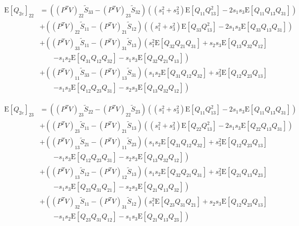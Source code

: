 \documentclass[10pt]{article}
\newcommand{\expect}[1]{\ensuremath{\mathrm{E}\left[ #1 \right]}}
\begin{document}
\begin{align}
	\expect{Q_{2e}}_{22} &= \left( (P^TV)_{22}\tilde{S}_{33} - (P^TV)_{23}\tilde{S}_{32} \right)\left( (s_1^2+s_3^2)\expect{Q_{11}Q_{13}^2} - 2s_1s_3\expect{Q_{11}Q_{13}Q_{31}} \right) \nonumber \\
	&+ \left( (P^TV)_{22}\tilde{S}_{11} - (P^TV)_{21}\tilde{S}_{12} \right)\left( (s_1^2+s_3^2)\expect{Q_{33}Q_{13}^2} - 2s_1s_3\expect{Q_{33}Q_{13}Q_{31}} \right) \nonumber \\
	&+ \left( (P^TV)_{33}\tilde{S}_{11} - (P^TV)_{31}\tilde{S}_{13} \right)\left( s_1^2\expect{Q_{32}Q_{21}Q_{31}} + s_2s_3\expect{Q_{13}Q_{32}Q_{12}} \right. \nonumber \\ &\qquad \left. - s_1s_2\expect{Q_{31}Q_{12}Q_{32}} - s_1s_3\expect{Q_{32}Q_{21}Q_{13}} \right) \nonumber \\
	&+ \left( (P^TV)_{11}\tilde{S}_{33} - (P^TV)_{13}\tilde{S}_{31} \right)\left( s_1s_2\expect{Q_{31}Q_{12}Q_{32}} + s_3^2\expect{Q_{12}Q_{23}Q_{13}} \right. \nonumber \\ &\qquad \left. - s_1s_3\expect{Q_{12}Q_{23}Q_{31}} - s_2s_3\expect{Q_{13}Q_{32}Q_{12}} \right)
\end{align}

\begin{align}
	\expect{Q_{2e}}_{23} &= \left( (P^TV)_{23}\tilde{S}_{22} - (P^TV)_{22}\tilde{S}_{23} \right)\left( (s_1^2+s_3^2)\expect{Q_{11}Q_{13}^2} - 2s_1s_3\expect{Q_{11}Q_{13}Q_{31}} \right) \nonumber \\
	&+ \left( (P^TV)_{23}\tilde{S}_{11} - (P^TV)_{21}\tilde{S}_{13} \right)\left( (s_1^2+s_3^2)\expect{Q_{22}Q_{13}^2} - 2s_1s_3\expect{Q_{22}Q_{13}Q_{31}} \right) \nonumber \\
	&+ \left( (P^TV)_{13}\tilde{S}_{21} - (P^TV)_{11}\tilde{S}_{23} \right)\left( s_1s_2\expect{Q_{31}Q_{12}Q_{32}} + s_3^2\expect{Q_{12}Q_{23}Q_{13}} \right. \nonumber \\ &\qquad \left. - s_1s_3\expect{Q_{12}Q_{23}Q_{31}} - s_2s_3\expect{Q_{13}Q_{32}Q_{12}} \right) \nonumber \\
	&+ \left( (P^TV)_{13}\tilde{S}_{12} - (P^TV)_{12}\tilde{S}_{13} \right)\left( s_1s_2\expect{Q_{32}Q_{21}Q_{31}} + s_3^2\expect{Q_{21}Q_{13}Q_{23}} \right. \nonumber \\ &\qquad \left. - s_1s_3\expect{Q_{23}Q_{31}Q_{21}} - s_2s_3\expect{Q_{21}Q_{13}Q_{32}} \right) \nonumber \\
	&+ \left( (P^TV)_{32}\tilde{S}_{11} - (P^TV)_{31}\tilde{S}_{12} \right)\left( s_1^2\expect{Q_{23}Q_{31}Q_{21}} + s_2s_3\expect{Q_{12}Q_{23}Q_{13}} \right. \nonumber \\ &\qquad \left. - s_1s_2\expect{Q_{23}Q_{31}Q_{12}} - s_1s_3\expect{Q_{21}Q_{13}Q_{23}} \right)
\end{align}
\end{document}
